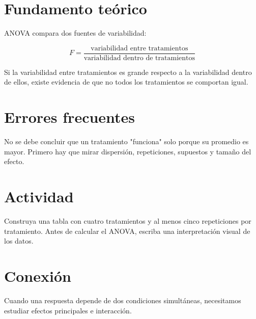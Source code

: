 \section{Fundamento teórico}

ANOVA compara dos fuentes de variabilidad:

\[
F = \frac{\text{variabilidad entre tratamientos}}{\text{variabilidad dentro de tratamientos}}
\]

Si la variabilidad entre tratamientos es grande respecto a la variabilidad dentro de ellos, existe evidencia de que no todos los tratamientos se comportan igual.

\section{Errores frecuentes}

\begin{cuidado}
No se debe concluir que un tratamiento "funciona" solo porque su promedio es mayor. Primero hay que mirar dispersión, repeticiones, supuestos y tamaño del efecto.
\end{cuidado}

\section{Actividad}

Construya una tabla con cuatro tratamientos y al menos cinco repeticiones por tratamiento. Antes de calcular el ANOVA, escriba una interpretación visual de los datos.

\section{Conexión}

Cuando una respuesta depende de dos condiciones simultáneas, necesitamos estudiar efectos principales e interacción.
